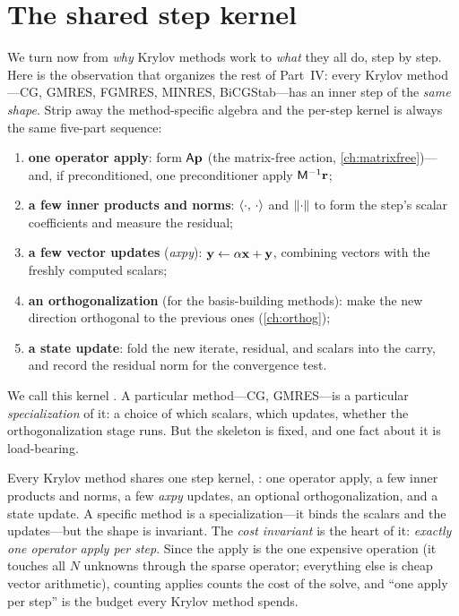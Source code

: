 \section{The shared step kernel}
\label{sec:krylov-kernel}

We turn now from \emph{why} Krylov methods work to \emph{what} they all do, step by
step. Here is the observation that organizes the rest of Part~IV: every Krylov
method---CG, GMRES, FGMRES, MINRES, BiCGStab---has an inner step of the \emph{same
shape}. Strip away the method-specific algebra and the per-step kernel is always
the same five-part sequence:
\begin{enumerate}[nosep]
  \item \textbf{one operator apply}: form $\mathsf{A}\mathbf{p}$ (the matrix-free action,
  \cref{ch:matrixfree})---and, if preconditioned, one preconditioner apply
  $\mathsf{M}^{-1}\mathbf{r}$;
  \item \textbf{a few inner products and norms}: $\left\langle \cdot,\, \cdot\right\rangle$ and
  $\lVert\cdot\rVert$ to form the step's scalar coefficients and measure the residual;
  \item \textbf{a few vector updates} (\emph{axpy}): $\mathbf{y}\leftarrow\alpha\mathbf{x}+\mathbf{y}$,
  combining vectors with the freshly computed scalars;
  \item \textbf{an orthogonalization} (for the basis-building methods): make the new
  direction orthogonal to the previous ones (\cref{ch:orthog});
  \item \textbf{a state update}: fold the new iterate, residual, and scalars into
  the carry, and record the residual norm for the convergence test.
\end{enumerate}
We call this kernel . A particular method---CG, GMRES---is a
particular \emph{specialization} of it: a choice of which scalars, which updates,
whether the orthogonalization stage runs. But the skeleton is fixed, and one fact
about it is load-bearing.

\begin{keyidea}
Every Krylov method shares one step kernel, : one operator apply,
a few inner products and norms, a few \emph{axpy} updates, an optional
orthogonalization, and a state update. A specific method is a specialization---it
binds the scalars and the updates---but the shape is invariant. The \emph{cost
invariant} is the heart of it: \emph{exactly one operator apply per step}. Since the
apply is the one expensive operation (it touches all $N$ unknowns through the sparse
operator; everything else is cheap vector arithmetic), counting applies counts the
cost of the solve, and ``one apply per step'' is the budget every Krylov method
spends.
\end{keyidea}

